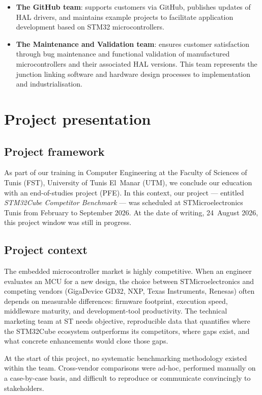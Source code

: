 \begin{itemize}
\item \textbf{The GitHub team}: supports customers via GitHub, publishes updates of HAL
drivers, and maintains example projects to facilitate application development based on
STM32 microcontrollers.
\item \textbf{The Maintenance and Validation team}: ensures customer satisfaction through
bug maintenance and functional validation of manufactured microcontrollers and their
associated HAL versions. This team represents the junction linking software and hardware
design processes to implementation and industrialisation.
\end{itemize}

\section{Project presentation}
\label{sec:project-presentation}

\subsection{Project framework}

As part of our training in Computer Engineering at the Faculty of Sciences of Tunis (FST),
University of Tunis El~Manar (UTM), we conclude our education with an end-of-studies
project (PFE). In this context, our project --- entitled \emph{STM32Cube Competitor
Benchmark} --- was scheduled at STMicroelectronics Tunis from February to September 2026.
At the date of writing, 24~August 2026, this project window was still in progress.

\subsection{Project context}
\label{sec:project-context}

The embedded microcontroller market is highly competitive. When an engineer evaluates an MCU
for a new design, the choice between STMicroelectronics and competing vendors (GigaDevice
GD32, NXP, Texas Instruments, Renesas) often depends on measurable differences: firmware
footprint, execution speed, middleware maturity, and development-tool productivity. The
technical marketing team at ST needs objective, reproducible data that quantifies where the
STM32Cube ecosystem outperforms its competitors, where gaps exist, and what concrete
enhancements would close those gaps.

At the start of this project, no systematic benchmarking methodology existed within the
team. Cross-vendor comparisons were ad-hoc, performed manually on a case-by-case basis,
and difficult to reproduce or communicate convincingly to stakeholders.

